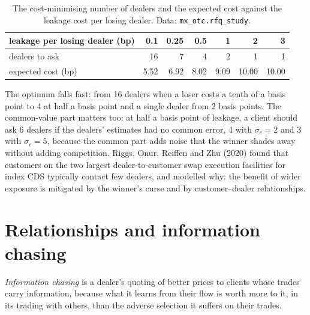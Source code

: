 \begin{table}[ht]
\centering
\small
\begin{tabular}{@{}lrrrrrr@{}}
\toprule
leakage per losing dealer (bp) & 0.1 & 0.25 & 0.5 & 1 & 2 & 3 \\
\midrule
dealers to ask & 16 & 7 & 4 & 2 & 1 & 1 \\
expected cost (bp) & 5.52 & 6.92 & 8.02 & 9.09 & 10.00 & 10.00 \\
\bottomrule
\end{tabular}
\caption{The cost-minimising number of dealers and the expected cost against the leakage cost per losing dealer. Data: \texttt{mx\_otc.rfq\_study}.}\label{tab:mx:request-for-quote-and-dealer-markets-in-theory:bestn}
\end{table}

The optimum falls fast: from 16 dealers when a loser costs a tenth of a basis point to 4 at half a basis point and a single dealer from 2 basis
points. The common-value part matters too: at half a basis point of leakage, a client should ask 6 dealers if the dealers' estimates had no common
error, 4 with $\sigma_c=2$ and 3 with $\sigma_c=5$, because the common part adds noise that the winner shades away without adding competition.
Riggs, Onur, Reiffen and Zhu (2020) found that customers on the two largest dealer-to-customer swap execution facilities for index CDS typically contact
few dealers, and modelled why: the benefit of wider exposure is mitigated by the winner's curse and by customer--dealer relationships.

\section{Relationships and information chasing}

\begin{definition}\label{def:mx:request-for-quote-and-dealer-markets-in-theory:chasing}
\emph{Information chasing} is a dealer's quoting of better prices to clients whose trades carry information, because
what it learns from their flow is worth more to it, in its trading with others, than the adverse selection it suffers on their trades.
\end{definition}

